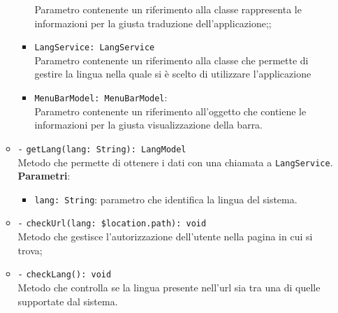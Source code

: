 \begin{itemize}
\begin{itemize}
\begin{itemize}
			Parametro contenente un riferimento alla classe rappresenta le informazioni per la giusta traduzione dell'applicazione;;
			\item \texttt{LangService: LangService} \\
			Parametro contenente un riferimento alla classe che permette di gestire la lingua nella quale si è scelto di utilizzare l'applicazione
			\item \texttt{MenuBarModel: MenuBarModel}: \\
			Parametro contenente un riferimento all'oggetto che contiene le informazioni per la giusta visualizzazione della barra.
		\end{itemize}
		\item \texttt{-} \texttt{getLang(lang: String): LangModel} \\ Metodo che permette di ottenere i dati con una chiamata a \texttt{LangService}.\\
		\textbf{Parametri}:
		\begin{itemize}
			\item \texttt{lang: String}: parametro che identifica la lingua del sistema.
		\end{itemize}
		\item \texttt{-} \texttt{checkUrl(lang: \$location.path): void} \\ Metodo che gestisce l'autorizzazione dell'utente nella pagina in cui si trova;
		\item \texttt{-} \texttt{checkLang(): void} \\ Metodo che controlla se la lingua presente nell'url sia tra una di quelle supportate dal sistema.
	\end{itemize}
\end{itemize}

